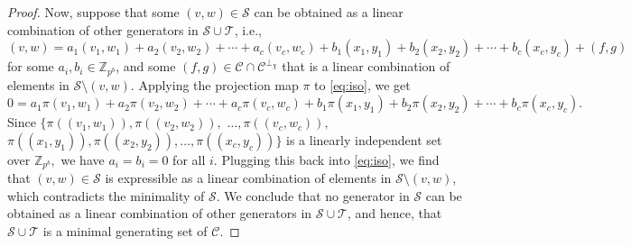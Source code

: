\documentclass{article}
\theoremstyle{remark}
\theoremstyle{definition}
\numberwithin{equation}{section}
\begin{document}
\begin{proof}
Now, suppose that some $(v,w) \in \mathcal{S}$ can be obtained as a linear combination of other generators in $\mathcal{S} \cup \mathcal{T}$, i.e., 
\begin{equation}\label{eq:iso}
(v,w)=a_1(v_1,w_1)+a_2(v_2,w_2)+\cdots+a_c(v_c,w_c)+b_1(x_1,y_1)+b_2(x_2,y_2)+\cdots+b_c(x_c,y_c)+(f,g) 
\end{equation} 
for some $a_i,b_i \in \mathbb{Z}_{p^b}$, and some $(f,g) \in \mathcal{C} \cap \mathcal{C}^{\perp_\chi}$ that is a linear combination of elements in  $\mathcal{S} \setminus (v,w)$. Applying the projection map $\pi$ to \eqref{eq:iso}, we get 
$0=a_1\pi(v_1,w_1)+a_2\pi(v_2,w_2)+\cdots+a_c\pi(v_c,w_c)+b_1\pi(x_1,y_1)+b_2\pi(x_2,y_2)+\cdots+b_c\pi(x_c,y_c).$
Since  $\{\pi((v_1,w_1)),\pi((v_2,w_2)),$ $\ldots, \pi((v_{c},w_{c})),$ $\pi((x_1,y_1)),\pi((x_2,y_2)),\ldots, \pi((x_{c},y_{c}))\}$ is a linearly independent set over $\mathbb{Z}_{p^b},$ we have $a_i=b_i=0$ for all $i$. Plugging this back into \eqref{eq:iso}, we find that $(v,w) \in \mathcal{S}$ is expressible as a linear combination of elements in $\mathcal{S} \setminus (v,w)$, which contradicts the minimality of $\mathcal{S}$. We conclude that no generator in $\mathcal{S}$ can be obtained as a linear combination of other generators in $\mathcal{S} \cup \mathcal{T}$, and hence, that $\mathcal{S} \cup \mathcal{T}$ is a minimal generating set of $\mathcal{C}$.
\end{proof}
\end{document}
